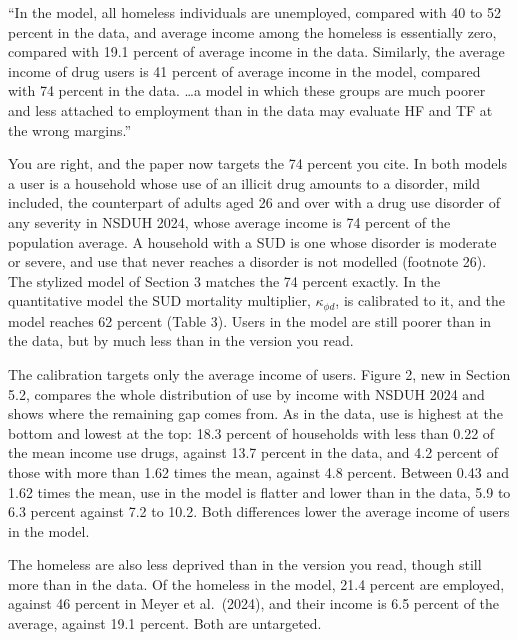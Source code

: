 \documentclass[11pt]{article}
\begin{document}
\begin{referee}
``In the model, all homeless individuals are unemployed, compared with 40 to 52
percent in the data, and average income among the homeless is essentially zero,
compared with 19.1 percent of average income in the data. Similarly, the average
income of drug users is 41 percent of average income in the model, compared with
74 percent in the data. \dots a model in which these groups are much poorer and
less attached to employment than in the data may evaluate HF and TF at the wrong
margins.''
\end{referee}
\begin{response}
\concede You are right, and the paper now targets the 74 percent you cite. In
both models a user is a household whose use of an illicit drug amounts to a
disorder, mild included, the counterpart of adults aged 26 and over with a drug
use disorder of any severity in NSDUH 2024, whose average income is 74 percent of
the population average. A household with a SUD is one whose disorder is moderate
or severe, and use that never reaches a disorder is not modelled (footnote 26).
The stylized model of Section 3 matches the 74 percent exactly. In the
quantitative model the SUD mortality multiplier, $\kappa_{\phi d}$, is calibrated
to it, and the model reaches 62 percent (Table 3). Users in the model are still
poorer than in the data, but by much less than in the version you read.

The calibration targets only the average income of users. Figure 2, new in
Section 5.2, compares the whole distribution of use by income with NSDUH 2024 and
shows where the remaining gap comes from. As in the data, use is highest at the
bottom and lowest at the top: 18.3 percent of households with less than 0.22 of
the mean income use drugs, against 13.7 percent in the data, and 4.2 percent of
those with more than 1.62 times the mean, against 4.8 percent. Between 0.43 and
1.62 times the mean, use in the model is flatter and lower than in the data, 5.9
to 6.3 percent against 7.2 to 10.2. Both differences lower the average income of
users in the model.

The homeless are also less deprived than in the version you read, though still
more than in the data. Of the homeless in the model, 21.4 percent are employed,
against 46 percent in Meyer et al.\ (2024), and their income is 6.5 percent of the
average, against 19.1 percent. Both are untargeted.


\end{response}
\end{document}
